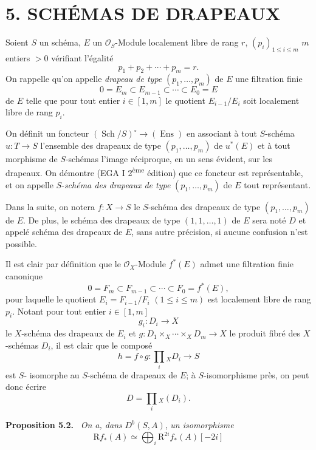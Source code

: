 \documentclass[11pt]{article}
\newenvironment{statement}[1]{\par\medskip\noindent\textbf{#1.}\ }{\par\medskip}
\newcommand{\R}{\mathrm{R}}\newcommand{\RHomCore}{\mathrm{RHom}}
\providecommand{\R}{\mathrm R}
\begin{document}
\section*{5. SCHÉMAS DE DRAPEAUX}

Soient $S$ un schéma, $E$ un $\mathcal O_S$-Module localement libre de rang $r$, $(p_i)_{1\le i\le m}$ $m$ entiers $>0$ vérifiant l'égalité
\[
p_1+p_2+\cdots+p_m=r.
\]
On rappelle qu'on appelle \emph{drapeau de type} $(p_1,\ldots,p_m)$ de $E$ une filtration finie
\[
0=E_m\subset E_{m-1}\subset\cdots\subset E_0=E
\]
de $E$ telle que pour tout entier $i\in[1,m]$ le quotient $E_{i-1}/E_i$ soit localement libre de rang $p_i$.

On définit un foncteur $(\operatorname{Sch}/S)^\circ\to(\operatorname{Ens})$ en associant à tout $S$-schéma $u:T\to S$ l'ensemble des drapeaux de type $(p_1,\ldots,p_m)$ de $u^*(E)$ et à tout morphisme de $S$-schémas l'image réciproque, en un sens évident, sur les drapeaux. On démontre (EGA I 2\textsuperscript{ème} édition) que ce foncteur est représentable, et on appelle $S$-\emph{schéma des drapeaux de type} $(p_1,\ldots,p_m)$ de $E$ tout représentant.

Dans la suite, on notera $f:X\to S$ le $S$-schéma des drapeaux de type $(p_1,\ldots,p_m)$ de $E$. De plus, le schéma des drapeaux de type $(1,1,\ldots,1)$ de $E$ sera noté $D$ et appelé schéma des drapeaux de $E$, sans autre précision, si aucune confusion n'est possible.

Il est clair par définition que le $\mathcal O_X$-Module $f^*(E)$ admet une filtration finie canonique
\[
0=F_m\subset F_{m-1}\subset\cdots\subset F_0=f^*(E),
\]
pour laquelle le quotient $E_i=F_{i-1}/F_i$ $(1\le i\le m)$ est localement libre de rang $p_i$. Notant pour tout entier $i\in[1,m]$
\[
g_i:D_i\to X
\]
le $X$-schéma des drapeaux de $E_i$ et $g:D_1\times_X\cdots\times_X D_m\to X$ le produit fibré des $X$-schémas $D_i$, il est clair que le composé
\[
h=f\circ g:\prod_i{}_XD_i\to S
\tag{5.1}
\]
est $S$-
isomorphe au $S$-schéma de drapeaux de $E$; à $S$-isomorphisme près, on peut donc écrire
\[
D=\prod_i{}_X(D_i).
\]

\begin{statement}{Proposition 5.2}
\emph{On a, dans} $D^b(S,A)$, \emph{un isomorphisme}
\[
\R f_*(A)\simeq\bigoplus_i \mathrm{R}^{2i}f_*(A)[-2i]
\]
\end{statement}
\end{document}
